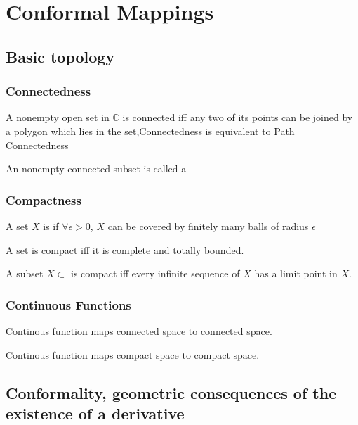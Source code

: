
\section{Conformal Mappings}
\subsection{Basic topology}
\subsubsection{Connectedness}
\begin{theorem}
    A nonempty open set in  $ \mathbb{C} $ is connected iff any two of its points can be joined by a polygon  which lies in the set,\ie Connectedness is equivalent to Path Connectedness
\end{theorem}
An nonempty connected subset is called a 
\subsubsection{Compactness}
\begin{definition}
    A set  $ X  $ is  if  $ \forall \epsilon>0  $,  $ X  $ can be covered by finitely many balls of radius  $ \epsilon  $ 
    
\end{definition}
\begin{theorem}
    A set is compact iff it is complete and totally bounded.
\end{theorem}
\begin{theorem}
    A subset  $ X\subset $ is compact iff every infinite sequence of  $ X  $ has a limit point in  $ X  $.
\end{theorem}
\subsubsection{Continuous Functions}
\begin{theorem}
    Continous function maps connected space to connected space.
\end{theorem}
\begin{theorem}
    Continous function maps compact space to compact space.
\end{theorem}
\subsection{Conformality, geometric consequences of the existence of a derivative}
